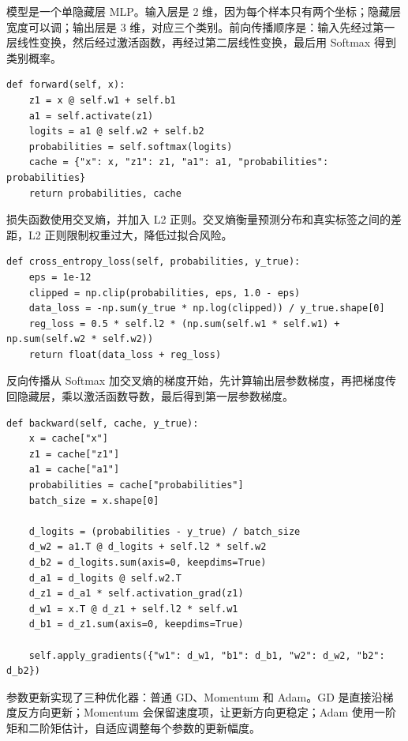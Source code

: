 \documentclass[UTF8]{ctexart}
\begin{document}
模型是一个单隐藏层 MLP。输入层是 2 维，因为每个样本只有两个坐标；隐藏层宽度可以调；输出层是 3 维，对应三个类别。前向传播顺序是：输入先经过第一层线性变换，然后经过激活函数，再经过第二层线性变换，最后用 Softmax 得到类别概率。

\begin{lstlisting}[caption={实验一：MLP 前向传播}]
def forward(self, x):
    z1 = x @ self.w1 + self.b1
    a1 = self.activate(z1)
    logits = a1 @ self.w2 + self.b2
    probabilities = self.softmax(logits)
    cache = {"x": x, "z1": z1, "a1": a1, "probabilities": probabilities}
    return probabilities, cache
\end{lstlisting}

损失函数使用交叉熵，并加入 L2 正则。交叉熵衡量预测分布和真实标签之间的差距，L2 正则限制权重过大，降低过拟合风险。

\begin{lstlisting}[caption={实验一：交叉熵损失与 L2 正则}]
def cross_entropy_loss(self, probabilities, y_true):
    eps = 1e-12
    clipped = np.clip(probabilities, eps, 1.0 - eps)
    data_loss = -np.sum(y_true * np.log(clipped)) / y_true.shape[0]
    reg_loss = 0.5 * self.l2 * (np.sum(self.w1 * self.w1) + np.sum(self.w2 * self.w2))
    return float(data_loss + reg_loss)
\end{lstlisting}

反向传播从 Softmax 加交叉熵的梯度开始，先计算输出层参数梯度，再把梯度传回隐藏层，乘以激活函数导数，最后得到第一层参数梯度。

\begin{lstlisting}[caption={实验一：反向传播核心}]
def backward(self, cache, y_true):
    x = cache["x"]
    z1 = cache["z1"]
    a1 = cache["a1"]
    probabilities = cache["probabilities"]
    batch_size = x.shape[0]

    d_logits = (probabilities - y_true) / batch_size
    d_w2 = a1.T @ d_logits + self.l2 * self.w2
    d_b2 = d_logits.sum(axis=0, keepdims=True)
    d_a1 = d_logits @ self.w2.T
    d_z1 = d_a1 * self.activation_grad(z1)
    d_w1 = x.T @ d_z1 + self.l2 * self.w1
    d_b1 = d_z1.sum(axis=0, keepdims=True)

    self.apply_gradients({"w1": d_w1, "b1": d_b1, "w2": d_w2, "b2": d_b2})
\end{lstlisting}

参数更新实现了三种优化器：普通 GD、Momentum 和 Adam。GD 是直接沿梯度反方向更新；Momentum 会保留速度项，让更新方向更稳定；Adam 使用一阶矩和二阶矩估计，自适应调整每个参数的更新幅度。
\end{document}
